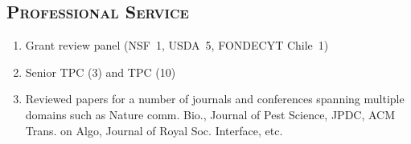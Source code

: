 \documentclass[margin,10pt]{res} %
\begin{document}
\begin{resume}
\section{\textnormal{\textsc{Professional Service}}}
\begin{enumerate}[$\circ$]
    \iftoggle{compact}{}{
    \item Professional service: 
    \begin{itemize}
    }
        \item Grant review panel (NSF~1, USDA~5, FONDECYT Chile~1)
        \item Senior TPC (3) and TPC (10)
        \item Reviewed papers for a number of journals and conferences
        spanning multiple domains such as Nature comm. Bio., Journal of
        Pest Science, JPDC, ACM Trans. on Algo, Journal of Royal Soc.
        Interface, etc.
        \iftoggle{compact}{}{
    \end{itemize}
    \item Biocomplexity Institute:
    \begin{itemize}
        \item Student and postdoc hiring committee in NSSAC 2018--2020.
        \item Student and postdoc hiring committee in NDSSL 2017--2018.
\item Member of graduate students admission team in NDSSL for the Fall'16
admissions
    \end{itemize}
}
\end{enumerate}

\iftoggle{compact}{}{
}
\end{resume}
\end{document}
